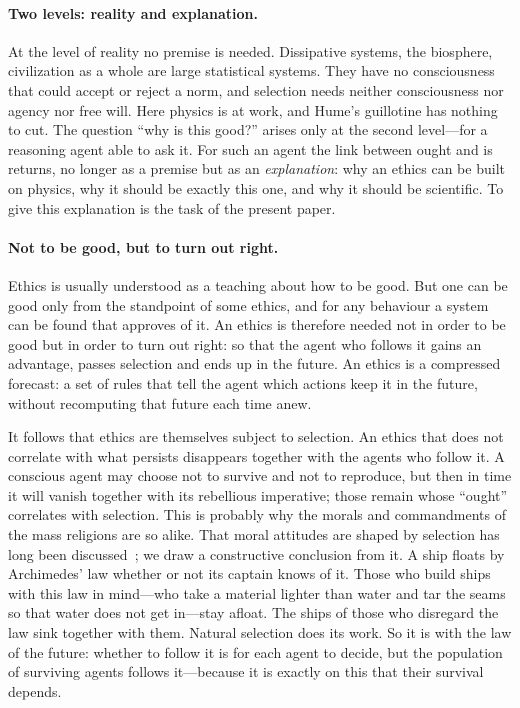 \documentclass[11pt,a4paper]{article}
\begin{document}
\paragraph{Two levels: reality and explanation.}
At the level of reality no premise is needed. Dissipative systems, the biosphere, civilization as a whole are large statistical systems. They have no consciousness that could accept or reject a norm, and selection needs neither consciousness nor agency nor free will. Here physics is at work, and Hume's guillotine has nothing to cut. The question ``why is this good?'' arises only at the second level---for a reasoning agent able to ask it. For such an agent the link between ought and is returns, no longer as a premise but as an \emph{explanation}: why an ethics can be built on physics, why it should be exactly this one, and why it should be scientific. To give this explanation is the task of the present paper.

\paragraph{Not to be good, but to turn out right.}
Ethics is usually understood as a teaching about how to be good. But one can be good only from the standpoint of some ethics, and for any behaviour a system can be found that approves of it. An ethics is therefore needed not in order to be good but in order to turn out right: so that the agent who follows it gains an advantage, passes selection and ends up in the future. An ethics is a compressed forecast: a set of rules that tell the agent which actions keep it in the future, without recomputing that future each time anew.

It follows that ethics are themselves subject to selection. An ethics that does not correlate with what persists disappears together with the agents who follow it. A conscious agent may choose not to survive and not to reproduce, but then in time it will vanish together with its rebellious imperative; those remain whose ``ought'' correlates with selection. This is probably why the morals and commandments of the mass religions are so alike. That moral attitudes are shaped by selection has long been discussed~\cite{ruse1986,street2006}; we draw a constructive conclusion from it. A ship floats by Archimedes' law whether or not its captain knows of it. Those who build ships with this law in mind---who take a material lighter than water and tar the seams so that water does not get in---stay afloat. The ships of those who disregard the law sink together with them. Natural selection does its work. So it is with the law of the future: whether to follow it is for each agent to decide, but the population of surviving agents follows it---because it is exactly on this that their survival depends.
\end{document}
